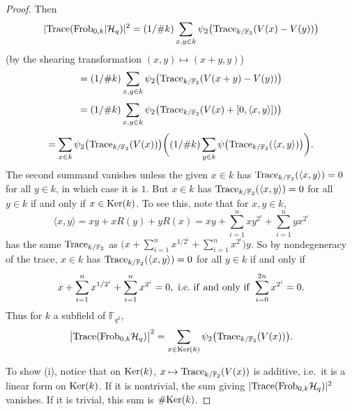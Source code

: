 \documentclass[11pt]{amsart}
\theoremstyle{plain}
\theoremstyle{definition}
\numberwithin{thm}{section}
\numberwithin{equation}{thm}
\newcommand{\Trace}{{\rm Trace}}
\newcommand{\Ker}{{\rm Ker}}
\newcommand{\sH}{{\mathcal H}}
\newcommand{\F}{{\mathbb F}}
\newcommand{\0}{\emptyset}
\newcommand{\Frob}{\mathrm{Frob}}
\begin{document}
\begin{proof}
Then 
$$|\Trace(\Frob_{0,k}|\sH_q)|^2 = (1/\#k)\sum_{x,y \in k}\psi_2\bigl(\Trace_{k/\F_2}(V(x)-V(y))\bigr)$$
(by the shearing transformation $(x,y)\mapsto (x+y,y)$)
$$= (1/\#k)\sum_{x,y \in k}\psi_2\bigl(\Trace_{k/\F_2}(V(x+y)-V(y))\bigr)$$
$$=(1/\#k)\sum_{x,y \in k}\psi_2\bigl(\Trace_{k/\F_2}(V(x) +[0,\langle x,y \rangle])\bigr)$$
$$ =\sum_{x \in k}\psi_2\bigl(\Trace_{k/\F_2}(V(x))\bigr)\biggl((1/\#k)\sum_{y \in k}\psi\bigl(\Trace_{k/\F_2}(\langle x,y \rangle)\bigr)\biggr).$$
The second summand vanishes unless the given $x \in k$ has $\Trace_{k/\F_2}(\langle x,y \rangle)=0$ for all $y \in k$, in which case it is $1$.
But $x \in k$ has $\Trace_{k/\F_2}(\langle x,y \rangle)=0$ for all $y \in k$ if and only if $x \in \Ker(k)$. To see this, note that for $x,y
\in k$, 
$$\langle x,y \rangle= xy +xR(y)+yR(x)=xy + \sum_{i=1}^n xy^{2^i} +\sum_{i=1}^n yx^{2^i} $$
has the same $\Trace_{k/\F_2}$ as
$\bigl(x +\sum_{i=1}^n x^{1/2^i} + \sum_{i=1}^n x^{2^i}\bigr)y$.
So by nondegeneracy of the trace, $x \in k$ has $\Trace_{k/\F_2}(\langle x,y \rangle)=0$ for all $y \in k$ if and only if
$$ x +\sum_{i=1}^n x^{1/2^i} + \sum_{i=1}^n x^{2^i} =0,\ {\rm i.e.\ if\ and\ only\ if\ }\sum_{i=0}^{2n}x^{2^i}=0.$$
Thus for $k$ a subfield of $\F_{q^2}$, 
$$\bigl{|}\Trace(\Frob_{0,k}\sH_q)\bigr{|}^2=\sum_{x \in \Ker(k)}\psi_2\bigl(\Trace_{k/\F_2}(V(x))\bigr).$$

To show (i), notice that on $\Ker(k)$, $x \mapsto \Trace_{k/\F_2}(V(x))$ is additive, i.e.\ it is a linear form on $\Ker(k)$. If it is nontrivial,
the sum giving $|\Trace(\Frob_{0,k}\sH_q)|^2$ vanishes. If it is trivial, this sum is $\#\Ker(k)$.


\end{proof}
\end{document}
